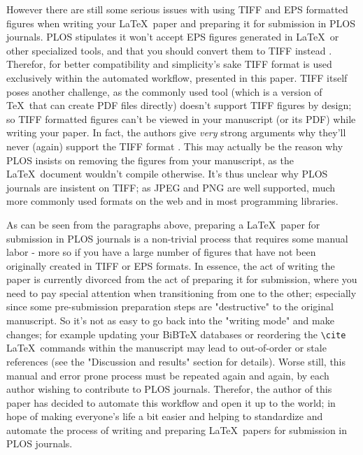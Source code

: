 However there are still some serious issues with using TIFF and EPS formatted figures when writing your \LaTeX~paper and preparing it for submission in PLOS journals.
PLOS stipulates it won't accept EPS figures generated in \LaTeX~or other specialized tools, and that you should convert them to TIFF instead \cite{PLOS:Figures, PLOS:LaTeX}.
Therefor, for better compatibility and simplicity's sake TIFF format is used exclusively within the automated workflow, presented in this paper.
TIFF itself poses another challenge, as the commonly used  tool (which is a version of \TeX~that can create PDF files directly) doesn't support TIFF figures by design; so TIFF formatted figures can't be viewed in your  manuscript (or its PDF) while writing your paper.
In fact, the  authors give \emph{very} strong arguments why they'll never (again) support the TIFF format \cite{StackExchange:LaTeX:tiff}.
This may actually be the reason why PLOS insists on removing the figures from your  manuscript, as the \LaTeX~document wouldn't compile otherwise.
It's thus unclear why PLOS journals are insistent on TIFF; as JPEG and PNG are well supported, much more commonly used formats on the web and in most programming libraries.

As can be seen from the paragraphs above, preparing a \LaTeX~paper for submission in PLOS journals is a non-trivial process that requires some manual labor - more so if you have a large number of figures that have not been originally created in TIFF or EPS formats.
In essence, the act of writing the paper is currently divorced from the act of preparing it for submission, where you need to pay special attention when transitioning from one to the other; especially since some pre-submission preparation steps are "destructive" to the original manuscript.
So it's not as easy to go back into the "writing mode" and make changes; for example updating your BiBTeX databases or reordering the \verb|\cite| \LaTeX~commands within the  manuscript may lead to out-of-order or stale references (see the "Discussion and results" section for details).
Worse still, this manual and error prone process must be repeated again and again, by each author wishing to contribute to PLOS journals.
Therefor, the author of this paper has decided to automate this workflow and open it up to the world; in hope of making everyone's life a bit easier and helping to standardize and automate the process of writing and preparing \LaTeX~papers for submission in PLOS journals.
